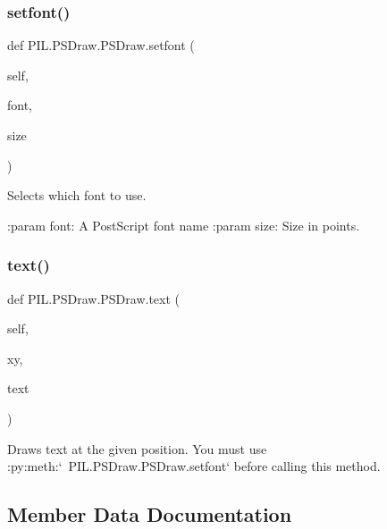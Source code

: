 \subsubsection{\texorpdfstring{setfont()}{setfont()}}
{\footnotesize\ttfamily def P\+I\+L.\+P\+S\+Draw.\+P\+S\+Draw.\+setfont (\begin{DoxyParamCaption}\item[{}]{self,  }\item[{}]{font,  }\item[{}]{size }\end{DoxyParamCaption})}

\begin{DoxyVerb}Selects which font to use.

:param font: A PostScript font name
:param size: Size in points.
\end{DoxyVerb}
 \mbox{\label{classPIL_1_1PSDraw_1_1PSDraw_a13bd49730a2a17bfbb05bdf4b74f8f30}} 
\subsubsection{\texorpdfstring{text()}{text()}}
{\footnotesize\ttfamily def P\+I\+L.\+P\+S\+Draw.\+P\+S\+Draw.\+text (\begin{DoxyParamCaption}\item[{}]{self,  }\item[{}]{xy,  }\item[{}]{text }\end{DoxyParamCaption})}

\begin{DoxyVerb}Draws text at the given position. You must use
:py:meth:`~PIL.PSDraw.PSDraw.setfont` before calling this method.
\end{DoxyVerb}
 

\subsection{Member Data Documentation}
\mbox{\label{classPIL_1_1PSDraw_1_1PSDraw_a655d736d0957ce64851577c7a8bee9b8}} 
